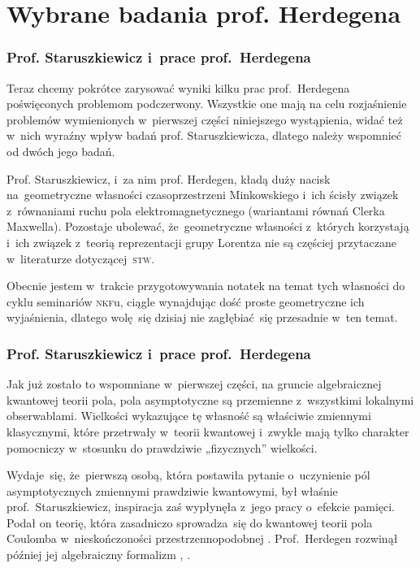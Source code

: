 \documentclass[10pt,t]{beamer}
\begin{document}
\section{Wybrane badania prof. Herdegena}


\begin{frame}
  \frametitle{Prof. Staruszkiewicz i~prace prof.~Herdegena}


  Teraz chcemy pokrótce zarysować wyniki kilku prac prof.~Herdegena
  poświęconych problemom podczerwony. Wszystkie one mają na celu
  rozjaśnienie problemów wymienionych w~pierwszej części niniejszego
  wystąpienia, widać też w~nich wyraźny wpływ badań prof. Staruszkiewicza,
  dlatego należy wspomnieć od dwóch jego badań.

  Prof. Staruszkiewicz, i~za nim prof. Herdegen, kładą duży nacisk
  na~geometryczne własności czasoprzestrzeni Minkowskiego i~ich ścisły
  związek z~równaniami ruchu pola elektromagnetycznego (wariantami równań
  Clerka Maxwella). Pozostaje ubolewać, że~geometryczne własności z~których
  korzystają i~ich związek z~teorią reprezentacji grupy Lorentza nie są
  częściej przytaczane w~literaturze dotyczącej~\textsc{stw}.

  Obecnie jestem w~trakcie przygotowywania notatek na temat tych własności
  do cyklu seminariów \textsc{nkf}u, ciągle wynajdując dość proste
  geometryczne ich wyjaśnienia, dlatego wolę~się dzisiaj nie zagłębiać~się
  przesadnie w~ten temat.

\end{frame}





\begin{frame}
  \frametitle{Prof. Staruszkiewicz i~prace prof.~Herdegena}


  Jak już zostało to wspomniane w~pierwszej części, na gruncie algebraicznej
  kwantowej teorii pola, pola asymptotyczne są przemienne z~wszystkimi
  lokalnymi obserwablami. Wielkości wykazujące tę własność są
  właściwie zmiennymi klasycznymi, które przetrwały w~teorii kwantowej
  i~zwykle mają tylko charakter pomocniczy w~stosunku do prawdziwie
  „fizycznych” wielkości.

  Wydaje~się, że~pierwszą osobą, która postawiła pytanie o~uczynienie pól
  asymptotycznych zmiennymi prawdziwie kwantowymi, był właśnie
  prof.~Staruszkiewicz, inspiracja zaś wypłynęła z~jego pracy o~efekcie
  pamięci. Podał on teorię, która zasadniczo sprowadza~się do kwantowej
  teorii pola Coulomba w~nieskończoności przestrzennopodobnej
  \parencite{Staruszkiewicz-Quantum-Mechanics-of-Phase-and-Charge-ETC-Pub-1989}.
  Prof.~Herdegen rozwinął później jej algebraiczny formalizm
  \parencite{Herdegen-Asymptotic-algebra-of-quantum-electrodynamics-Pub-2005},
  \parencite{Herdegen-Remarks-on-mathematical-structure-of-ETC-Pub-2022} .

\end{frame}
\end{document}
